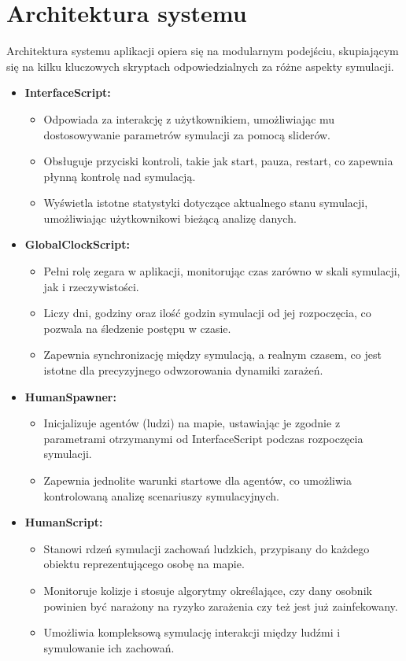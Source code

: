 \section{\textbf{Architektura systemu}}

Architektura systemu aplikacji opiera się na modularnym podejściu, skupiającym się na kilku kluczowych skryptach odpowiedzialnych za różne aspekty symulacji.

\begin{itemize}
	\item \textbf{InterfaceScript:}
	\begin{itemize}
		\item Odpowiada za interakcję z użytkownikiem, umożliwiając mu dostosowywanie parametrów symulacji za pomocą sliderów.
		\item Obsługuje przyciski kontroli, takie jak start, pauza, restart, co zapewnia płynną kontrolę nad symulacją.
		\item Wyświetla istotne statystyki dotyczące aktualnego stanu symulacji, umożliwiając użytkownikowi bieżącą analizę danych.
	\end{itemize}
	
	\item \textbf{GlobalClockScript:}
	\begin{itemize}
		\item Pełni rolę zegara w aplikacji, monitorując czas zarówno w skali symulacji, jak i rzeczywistości.
		\item Liczy dni, godziny oraz ilość godzin symulacji od jej rozpoczęcia, co pozwala na śledzenie postępu w czasie.
		\item Zapewnia synchronizację między symulacją, a realnym czasem, co jest istotne dla precyzyjnego odwzorowania dynamiki zarażeń.
	\end{itemize}
	
	\item \textbf{HumanSpawner:}
	\begin{itemize}
		\item Inicjalizuje agentów (ludzi) na mapie, ustawiając je zgodnie z parametrami otrzymanymi od InterfaceScript podczas rozpoczęcia symulacji.
		\item Zapewnia jednolite warunki startowe dla agentów, co umożliwia kontrolowaną analizę scenariuszy symulacyjnych.
	\end{itemize}
	
	\item \textbf{HumanScript:}
	\begin{itemize}
		\item Stanowi rdzeń symulacji zachowań ludzkich, przypisany do każdego obiektu reprezentującego osobę na mapie.
		\item Monitoruje kolizje i stosuje algorytmy określające, czy dany osobnik powinien być narażony na ryzyko zarażenia czy też jest już zainfekowany.
		\item Umożliwia kompleksową symulację interakcji między ludźmi i symulowanie ich zachowań.
	\end{itemize}
	

\end{itemize}
